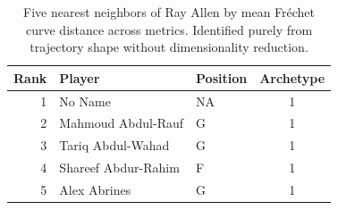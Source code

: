 \begin{table}[htbp]
  \centering\small
  \begin{tabular}{rllc}
    \toprule
    Rank & Player & Position & Archetype \\
    \midrule
    1 & No Name & NA & 1 \\
    2 & Mahmoud Abdul-Rauf & G & 1 \\
    3 & Tariq Abdul-Wahad & G & 1 \\
    4 & Shareef Abdur-Rahim & F & 1 \\
    5 & Alex Abrines & G & 1 \\
    \bottomrule
  \end{tabular}
  \caption{Five nearest neighbors of Ray Allen by mean Fr\'{e}chet curve distance across metrics. Identified purely from trajectory shape without dimensionality reduction.}
\end{table}

